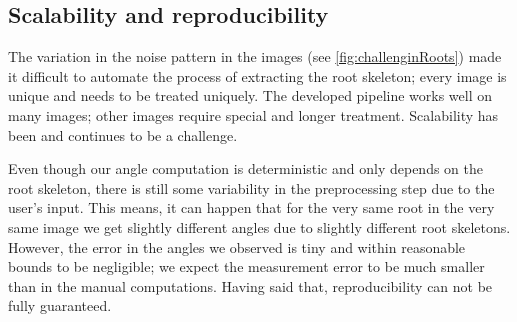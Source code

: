 



\subsection{Scalability and reproducibility}

The variation in the noise pattern in the images (see \ref{fig:challenginRoots}) made it difficult to automate the process of extracting the root skeleton; every image is unique and needs to be treated uniquely. The developed pipeline works well on many images; other images require special and longer treatment. Scalability has been and continues to be a challenge.

Even though our angle computation is deterministic %
and only depends on the root skeleton, there is still some variability in the preprocessing step due to the user's input. This means, it can happen that for the very same root in the very same image we get slightly different angles due to slightly different root skeletons. %
However, the error in the angles we observed is tiny and within reasonable bounds to be negligible; we expect the measurement error to be much smaller than in the manual computations. Having said that, reproducibility can not be fully guaranteed. %


